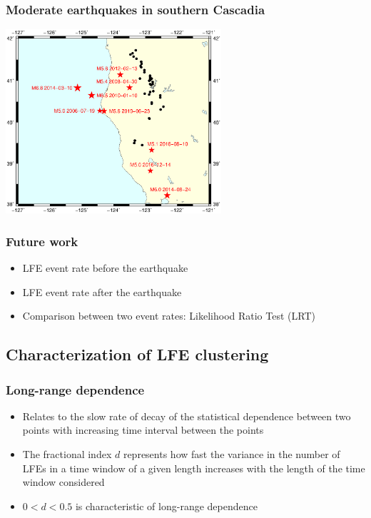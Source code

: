 \documentclass{beamer}
\begin{document}
	\begin{frame}
		\frametitle{Moderate earthquakes in southern Cascadia}
		\begin{center}
			\includegraphics[trim={1cm 4cm 1cm 10cm}, clip, width=8cm]{catalog_SC/earthquakes_map.eps}
		\end{center}
	\end{frame}

	\begin{frame}
		\frametitle{Future work}
		\begin{itemize}
			\item LFE event rate before the earthquake
			\item LFE event rate after the earthquake
			\item Comparison between two event rates: Likelihood Ratio Test (LRT)
		\end{itemize}
	\end{frame}


	\subsection{Characterization of LFE clustering}

	\begin{frame}
		\frametitle{Long-range dependence}
		\begin{itemize}
			\item Relates to the slow rate of decay of the statistical dependence between two points with increasing time interval between the points
			\item The fractional index $d$ represents how fast the variance in the number of LFEs in a time window of a given length increases with the length of the time window considered
			\item $0 < d < 0.5$ is characteristic of long-range dependence
		\end{itemize}
	\end{frame}
\end{document}
